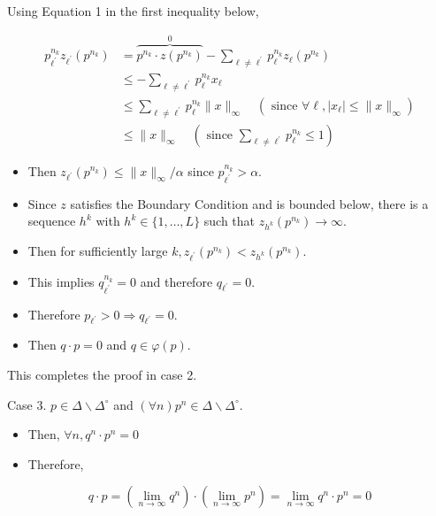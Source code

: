 \documentclass[10pt]{article}
\begin{document}
Using Equation 1 in the first inequality below,

$$
\begin{aligned}
p_{\ell^{\prime}}^{n_{k}} z_{\ell^{\prime}}\left(p^{n_{k}}\right) & =\overbrace{p^{n_{k}} \cdot z\left(p^{n_{k}}\right)}^{0}-\sum_{\ell \neq \ell^{\prime}} p_{\ell}^{n_{k}} z_{\ell}\left(p^{n_{k}}\right) \\
& \leq-\sum_{\ell \neq \ell^{\prime}} p_{\ell}^{n_{k}} x_{\ell} \\
& \leq \sum_{\ell \neq \ell^{\prime}} p_{\ell}^{n_{k}}\|x\|_{\infty} \quad\left(\text { since } \forall \ell,\left|x_{\ell}\right| \leq\|x\|_{\infty}\right) \\
& \leq\|x\|_{\infty} \quad\left(\text { since } \sum_{\ell \neq \ell^{\prime}} p_{\ell}^{n_{k}} \leq 1\right)
\end{aligned}
$$

\begin{itemize}
  \item Then $z_{\ell^{\prime}}\left(p^{n_{k}}\right) \leq\|x\|_{\infty} / \alpha$ since $p_{\ell^{\prime}}^{n_{k}}>\alpha$.
  \item Since $z$ satisfies the Boundary Condition and is bounded below, there is a sequence $h^{k}$ with $h^{k} \in\{1, \ldots, L\}$ such that $z_{h^{k}}\left(p^{n_{k}}\right) \rightarrow \infty$.
  \item Then for sufficiently large $k, z_{\ell^{\prime}}\left(p^{n_{k}}\right)<z_{h^{k}}\left(p^{n_{k}}\right)$.
  \item This implies $q_{\ell^{\prime}}^{n_{k}}=0$ and therefore $q_{\ell^{\prime}}=0$.
  \item Therefore $p_{\ell^{\prime}}>0 \Longrightarrow q_{\ell^{\prime}}=0$.
  \item Then $q \cdot p=0$ and $q \in \varphi(p)$.
\end{itemize}

This completes the proof in case 2.

Case 3. $p \in \Delta \backslash \Delta^{\circ}$ and $(\forall n) p^{n} \in \Delta \backslash \Delta^{\circ}$.

\begin{itemize}
  \item Then, $\forall n, q^{n} \cdot p^{n}=0$
  \item Therefore,
\end{itemize}

$$
q \cdot p=\left(\lim _{n \rightarrow \infty} q^{n}\right) \cdot\left(\lim _{n \rightarrow \infty} p^{n}\right)=\lim _{n \rightarrow \infty} q^{n} \cdot p^{n}=0
$$
\end{document}
